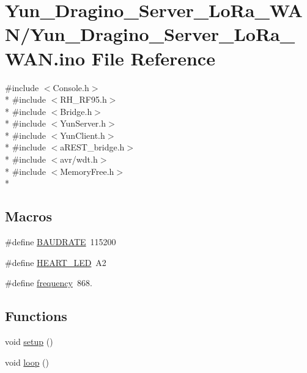 \hypertarget{Yun__Dragino__Server__LoRa__WAN_8ino}{\section{Yun\-\_\-\-Dragino\-\_\-\-Server\-\_\-\-Lo\-Ra\-\_\-\-W\-A\-N/\-Yun\-\_\-\-Dragino\-\_\-\-Server\-\_\-\-Lo\-Ra\-\_\-\-W\-A\-N.ino File Reference}
\label{Yun__Dragino__Server__LoRa__WAN_8ino}
}
{\ttfamily \#include $<$Console.\-h$>$}\\*
{\ttfamily \#include $<$R\-H\-\_\-\-R\-F95.\-h$>$}\\*
{\ttfamily \#include $<$Bridge.\-h$>$}\\*
{\ttfamily \#include $<$Yun\-Server.\-h$>$}\\*
{\ttfamily \#include $<$Yun\-Client.\-h$>$}\\*
{\ttfamily \#include $<$a\-R\-E\-S\-T\-\_\-bridge.\-h$>$}\\*
{\ttfamily \#include $<$avr/wdt.\-h$>$}\\*
{\ttfamily \#include $<$Memory\-Free.\-h$>$}\\*
\subsection*{Macros}
\begin{DoxyCompactItemize}
\item 
\#define \hyperlink{Yun__Dragino__Server__LoRa__WAN_8ino_a734bbab06e1a9fd2e5522db0221ff6e3}{B\-A\-U\-D\-R\-A\-T\-E}~115200
\item 
\#define \hyperlink{Yun__Dragino__Server__LoRa__WAN_8ino_ab5e96fdebe625793e8ec86ab6b5d9043}{H\-E\-A\-R\-T\-\_\-\-L\-E\-D}~A2
\item 
\#define \hyperlink{Yun__Dragino__Server__LoRa__WAN_8ino_a6556f9ceceffdd10267822cefcb49ea5}{frequency}~868.
\end{DoxyCompactItemize}
\subsection*{Functions}
\begin{DoxyCompactItemize}
\item 
void \hyperlink{Yun__Dragino__Server__LoRa__WAN_8ino_a4fc01d736fe50cf5b977f755b675f11d}{setup} ()
\item 
void \hyperlink{Yun__Dragino__Server__LoRa__WAN_8ino_afe461d27b9c48d5921c00d521181f12f}{loop} ()
\end{DoxyCompactItemize}
